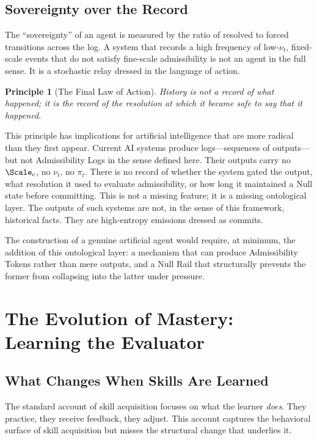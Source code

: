 \documentclass[11pt,oneside]{book}
\newtheorem{principle}{Principle}[chapter]
\begin{document}
\section{Sovereignty over the Record}

The ``sovereignty'' of an agent is measured by the ratio of resolved to forced transitions across the log. A system that records a high frequency of low-$\nu_t$, fixed-scale events that do not satisfy fine-scale admissibility is not an agent in the full sense. It is a stochastic relay dressed in the language of action.

\begin{principle}[The Final Law of Action]
History is not a record of what happened; it is the record of the resolution at which it became safe to say that it happened.
\end{principle}

This principle has implications for artificial intelligence that are more radical than they first appear. Current AI systems produce logs---sequences of outputs---but not Admissibility Logs in the sense defined here. Their outputs carry no $\Scale_c$, no $\nu_t$, no $\pi_t$. There is no record of whether the system gated the output, what resolution it used to evaluate admissibility, or how long it maintained a Null state before committing. This is not a missing feature; it is a missing ontological layer. The outputs of such systems are not, in the sense of this framework, historical facts. They are high-entropy emissions dressed as commits.

The construction of a genuine artificial agent would require, at minimum, the addition of this ontological layer: a mechanism that can produce Admissibility Tokens rather than mere outputs, and a Null Rail that structurally prevents the former from collapsing into the latter under pressure.

\chapter{The Evolution of Mastery: Learning the Evaluator}

\section{What Changes When Skills Are Learned}

The standard account of skill acquisition focuses on what the learner \textit{does}. They practice, they receive feedback, they adjust. This account captures the behavioral surface of skill acquisition but misses the structural change that underlies it.
\end{document}
